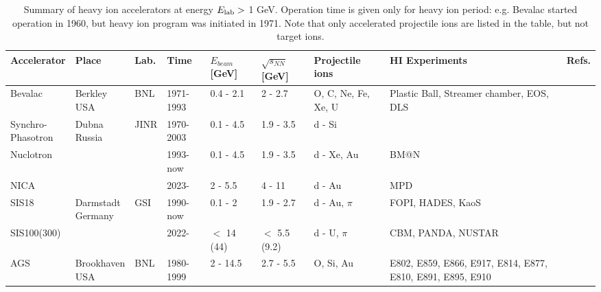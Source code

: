 \begin{table}
 \footnotesize
 \caption{Summary of heavy ion accelerators at energy $E_\mathrm{lab} > $ 1 GeV.
          Operation time is given only for heavy ion period: e.g. Bevalac started
          operation in 1960, but heavy ion program was initiated in 1971.
          Note that only accelerated projectile ions are listed in the table, but not target
          ions.}
 \label{tab:HI_accelerators}
\begin{tabular}{llllllm{1cm}m{2cm}l}
  \toprule
  Accelerator                       &  Place                         &  Lab.  & Time       & $E_{beam}$ [GeV]    & $\sqrt{s_{NN}}$ [GeV]   & Projectile ions           & HI Experiments  & Refs.\\
  \midrule
  Bevalac                           & \pbox{20cm}{Berkley\\USA}       & BNL          & 1971-1993  & 0.4 - 2.1           & 2 - 2.7                 & O, C, Ne, Fe, Xe, U  & Plastic Ball, Streamer chamber, EOS, DLS & \cite{Barale:1975bb,Alonso:1982md} \\
  \midrule
  \pbox{20cm}{Synchro-\\Phasotron}  & \pbox{20cm}{Dubna\\Russia}      & JINR         & 1970-2003  & 0.1 - 4.5           & 1.9 - 3.5               & d - Si       &  & \cite{Malakhov:2013zjq} \\
  Nuclotron                         &                                 &              & 1993-now   & 0.1 - 4.5           & 1.9 - 3.5               & d - Xe, Au   & BM@N & \cite{Kovalenko:2016qmy,Kuznetsov:2016ynd} \\
  NICA                              &                                 &              & 2023-      & 2 - 5.5             & 4 - 11                  & d - Au       & MPD &  \cite{Kozlov:2016nbo, Kekelidze:2012zz} \\
  \midrule
  SIS18                             & \pbox{20cm}{Darmstadt\\Germany} & GSI          & 1990-now   & 0.1 - 2             & 1.9 - 2.7               & d - Au, $\pi$ & FOPI, HADES, KaoS & \cite{cbm_physics_book} \\
  SIS100(300)                       &                                 &              & 2022-      & $<$ 14 (44)         & $<$ 5.5 (9.2)           & d - U, $\pi$ & CBM, PANDA, NUSTAR & \cite{cbm_physics_book} \\
  \midrule
  AGS                               & \pbox{20cm}{Brookhaven\\USA}    & BNL          & 1980-1999  & 2 - 14.5            & 2.7 - 5.5               & O, Si, Au    & E802, E859, E866, E917, E814, E877, E810, E891, E895, E910 & \cite{cbm_physics_book, AGS_exp} \\

\end{tabular}
\end{table}

